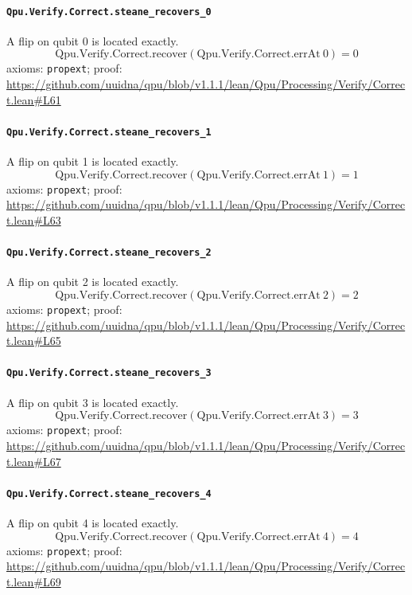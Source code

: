 \documentclass[11pt]{article}
\begin{document}
\paragraph{\texttt{Qpu.Verify.Correct.steane\_recovers\_0}}
A flip on qubit 0 is located exactly.
\[ \mathrm{Qpu.Verify.Correct.recover} (\mathrm{Qpu.Verify.Correct.errAt}\ 0) = 0 \]
\noindent axioms: \texttt{propext}; proof: \url{https://github.com/uuidna/qpu/blob/v1.1.1/lean/Qpu/Processing/Verify/Correct.lean\#L61}

\paragraph{\texttt{Qpu.Verify.Correct.steane\_recovers\_1}}
A flip on qubit 1 is located exactly.
\[ \mathrm{Qpu.Verify.Correct.recover} (\mathrm{Qpu.Verify.Correct.errAt}\ 1) = 1 \]
\noindent axioms: \texttt{propext}; proof: \url{https://github.com/uuidna/qpu/blob/v1.1.1/lean/Qpu/Processing/Verify/Correct.lean\#L63}

\paragraph{\texttt{Qpu.Verify.Correct.steane\_recovers\_2}}
A flip on qubit 2 is located exactly.
\[ \mathrm{Qpu.Verify.Correct.recover} (\mathrm{Qpu.Verify.Correct.errAt}\ 2) = 2 \]
\noindent axioms: \texttt{propext}; proof: \url{https://github.com/uuidna/qpu/blob/v1.1.1/lean/Qpu/Processing/Verify/Correct.lean\#L65}

\paragraph{\texttt{Qpu.Verify.Correct.steane\_recovers\_3}}
A flip on qubit 3 is located exactly.
\[ \mathrm{Qpu.Verify.Correct.recover} (\mathrm{Qpu.Verify.Correct.errAt}\ 3) = 3 \]
\noindent axioms: \texttt{propext}; proof: \url{https://github.com/uuidna/qpu/blob/v1.1.1/lean/Qpu/Processing/Verify/Correct.lean\#L67}

\paragraph{\texttt{Qpu.Verify.Correct.steane\_recovers\_4}}
A flip on qubit 4 is located exactly.
\[ \mathrm{Qpu.Verify.Correct.recover} (\mathrm{Qpu.Verify.Correct.errAt}\ 4) = 4 \]
\noindent axioms: \texttt{propext}; proof: \url{https://github.com/uuidna/qpu/blob/v1.1.1/lean/Qpu/Processing/Verify/Correct.lean\#L69}
\end{document}
